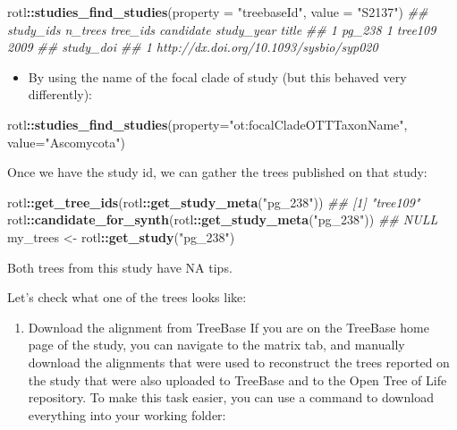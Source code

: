 \documentclass[]{article}
\newenvironment{Shaded}{\begin{snugshade}}{\end{snugshade}}
\newcommand{\CommentTok}[1]{\textcolor[rgb]{0.56,0.35,0.01}{\textit{#1}}}
\newcommand{\DataTypeTok}[1]{\textcolor[rgb]{0.13,0.29,0.53}{#1}}
\newcommand{\KeywordTok}[1]{\textcolor[rgb]{0.13,0.29,0.53}{\textbf{#1}}}
\newcommand{\NormalTok}[1]{#1}
\newcommand{\OperatorTok}[1]{\textcolor[rgb]{0.81,0.36,0.00}{\textbf{#1}}}
\newcommand{\StringTok}[1]{\textcolor[rgb]{0.31,0.60,0.02}{#1}}
\providecommand{\tightlist}{%
  \setlength{\itemsep}{0pt}\setlength{\parskip}{0pt}}
\begin{document}
\begin{Shaded}
\begin{Highlighting}[]
\NormalTok{rotl}\OperatorTok{::}\KeywordTok{studies_find_studies}\NormalTok{(}\DataTypeTok{property =} \StringTok{"treebaseId"}\NormalTok{, }\DataTypeTok{value =} \StringTok{"S2137"}\NormalTok{)}
\CommentTok{##   study_ids n_trees tree_ids candidate study_year title}
\CommentTok{## 1    pg_238       1  tree109                 2009      }
\CommentTok{##                                 study_doi}
\CommentTok{## 1 http://dx.doi.org/10.1093/sysbio/syp020}
\end{Highlighting}
\end{Shaded}

\begin{itemize}
\tightlist
\item
  By using the name of the focal clade of study (but this behaved very differently):
\end{itemize}

\begin{Shaded}
\begin{Highlighting}[]
\NormalTok{rotl}\OperatorTok{::}\KeywordTok{studies_find_studies}\NormalTok{(}\DataTypeTok{property=}\StringTok{"ot:focalCladeOTTTaxonName"}\NormalTok{, }\DataTypeTok{value=}\StringTok{"Ascomycota"}\NormalTok{)}
\end{Highlighting}
\end{Shaded}

Once we have the study id, we can gather the trees published on that study:

\begin{Shaded}
\begin{Highlighting}[]
\NormalTok{rotl}\OperatorTok{::}\KeywordTok{get_tree_ids}\NormalTok{(rotl}\OperatorTok{::}\KeywordTok{get_study_meta}\NormalTok{(}\StringTok{"pg_238"}\NormalTok{))}
\CommentTok{## [1] "tree109"}
\NormalTok{rotl}\OperatorTok{::}\KeywordTok{candidate_for_synth}\NormalTok{(rotl}\OperatorTok{::}\KeywordTok{get_study_meta}\NormalTok{(}\StringTok{"pg_238"}\NormalTok{))}
\CommentTok{## NULL}
\NormalTok{my_trees <-}\StringTok{ }\NormalTok{rotl}\OperatorTok{::}\KeywordTok{get_study}\NormalTok{(}\StringTok{"pg_238"}\NormalTok{)}
\end{Highlighting}
\end{Shaded}

Both trees from this study have NA tips.

Let's check what one of the trees looks like:

\begin{enumerate}
\def\labelenumi{\arabic{enumi}.}
\tightlist
\item
  Download the alignment from TreeBase
  If you are on the TreeBase home page of the study, you can navigate to the matrix tab, and manually download the alignments that were used to reconstruct the trees reported on the study that were also uploaded to TreeBase and to the Open Tree of Life repository.
  To make this task easier, you can use a command to download everything into your working folder:
\end{enumerate}
\end{document}
